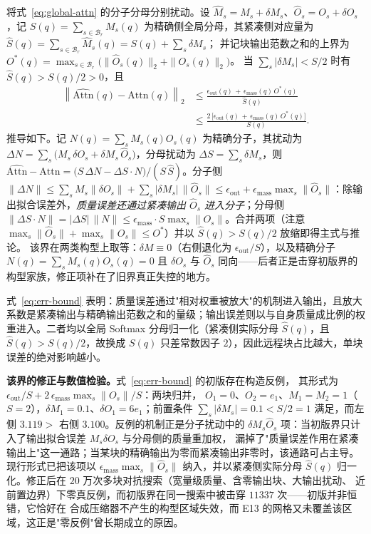 将式~\eqref{eq:global-attn} 的分子分母分别扰动。设
$\widehat{M}_s = M_s + \delta M_s$、$\widehat{O}_s = O_s + \delta O_s$，记
$S(q) = \sum_{s \in \mathcal{B}_r} M_s(q)$ 为精确侧全局分母，其紧凑侧对应量为
$\widehat{S}(q) = \sum_{s \in \mathcal{B}_r} \widehat{M}_s(q) = S(q) + \sum_s \delta M_s$；
并记块输出范数之和的上界为
$O^{\ast}(q) = \max_{s \in \mathcal{B}_r}\big(\|\widehat{O}_s(q)\|_2 + \|O_s(q)\|_2\big)$。
当 $\sum_s |\delta M_s| < S/2$ 时有 $\widehat{S}(q) > S(q)/2 > 0$，且
\begin{equation}
\label{eq:err-bound}
\begin{aligned}
\left\| \widehat{\mathrm{Attn}}(q) - \mathrm{Attn}(q) \right\|_2
&\le \frac{\epsilon_{\text{out}}(q) \,+\, \epsilon_{\text{mass}}(q)\,O^{\ast}(q)}{\widehat{S}(q)} \\
&\le \frac{2\,\Big[\epsilon_{\text{out}}(q) \,+\, \epsilon_{\text{mass}}(q)\,O^{\ast}(q)\Big]}{S(q)} .
\end{aligned}
\end{equation}
推导如下。记 $N(q)=\sum_s M_s(q)O_s(q)$ 为精确分子，其扰动为
$\Delta N=\sum_s\big(M_s\,\delta O_s+\delta M_s\,\widehat{O}_s\big)$，分母扰动为
$\Delta S=\sum_s\delta M_s$，则
$\widehat{\mathrm{Attn}} - \mathrm{Attn} = \big(S\,\Delta N - \Delta S \cdot N\big)/(S\,\widehat{S})$。分子侧
$\|\Delta N\| \le \sum_s M_s\|\delta O_s\| + \sum_s |\delta M_s|\,\|\widehat{O}_s\| \le \epsilon_{\text{out}} + \epsilon_{\text{mass}}\max_s\|\widehat{O}_s\|$：除输出拟合误差外，\emph{质量误差还通过紧凑输出 $\widehat{O}_s$ 进入分子}；分母侧
$\|\Delta S \cdot N\| = |\Delta S|\,\|N\| \le \epsilon_{\text{mass}} \cdot S \max_s\|O_s\|$。合并两项（注意 $\max_s\|\widehat{O}_s\|+\max_s\|O_s\|\le O^{\ast}$）并以 $\widehat{S}(q) > S(q)/2$ 放缩即得主式与推论。
该界在两类构型上取等：$\delta M\equiv0$（右侧退化为 $\epsilon_{\text{out}}/S$），以及精确分子
$N(q)=\sum_s M_s(q)O_s(q)=0$ 且 $\delta O_s$ 与 $\widehat{O}_s$ 同向——后者正是击穿初版界的
构型家族，修正项补在了旧界真正失控的地方。

式~\eqref{eq:err-bound} 表明：质量误差通过"相对权重被放大"的机制进入输出，且放大系数是紧凑输出与精确输出范数之和的量级；输出误差则以与自身质量成比例的权重进入。二者均以全局 Softmax 分母归一化（紧凑侧实际分母 $\widehat{S}(q)$，且 $\widehat{S}(q) > S(q)/2$，故换成 $S(q)$ 只差常数因子 $2$），因此远程块占比越大，单块误差的绝对影响越小。

\textbf{该界的修正与数值检验。}式~\eqref{eq:err-bound} 的初版存在构造反例，
其形式为 $\epsilon_{\text{out}}/S + 2\,\epsilon_{\text{mass}}\max_s\|O_s\|/S$：两块归并，
$O_1=0$、$O_2=e_1$、$M_1=M_2=1$（$S=2$），$\delta M_1=0.1$、$\delta O_1=6e_1$；前置条件
$\sum_s|\delta M_s|=0.1<S/2=1$ 满足，而左侧 $3.119>$ 右侧 $3.100$。反例的机制正是分子扰动中的
$\delta M_s\widehat{O}_s$ 项：当初版界只计入了输出拟合误差 $M_s\delta O_s$ 与分母侧的质量重加权，
漏掉了"质量误差作用在紧凑输出上"这一通路；当某块的精确输出为零而紧凑输出非零时，该通路可占主导。
现行形式已把该项以 $\epsilon_{\text{mass}}\max_s\|\widehat{O}_s\|$ 纳入，并以紧凑侧实际分母
$\widehat{S}(q)$ 归一化。修正后在 $20$ 万次多块对抗搜索（宽量级质量、含零输出块、大输出扰动、
近前置边界）下零真反例，而初版界在同一搜索中被击穿 $11337$ 次——初版并非恒错，它恰好在
合成压缩器不产生的构型区域失效，而 E13 的网格又未覆盖该区域，这正是"零反例"曾长期成立的原因。

